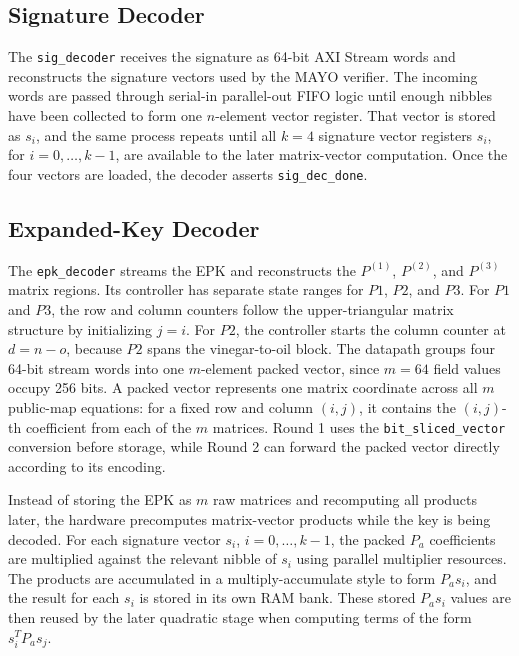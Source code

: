 \documentclass[conference]{IEEEtran}
\begin{document}
\subsection{Signature Decoder}
The \texttt{sig\_decoder} receives the signature as 64-bit AXI Stream words and reconstructs the signature vectors used by the MAYO verifier. The incoming words are passed through serial-in parallel-out FIFO logic until enough nibbles have been collected to form one \(n\)-element vector register. That vector is stored as \(s_i\), and the same process repeats until all \(k=4\) signature vector registers \(s_i\), for \(i=0,\ldots,k-1\), are available to the later matrix-vector computation. Once the four vectors are loaded, the decoder asserts \texttt{sig\_dec\_done}.

\subsection{Expanded-Key Decoder}
The \texttt{epk\_decoder} streams the EPK and reconstructs the \(P^{(1)}\), \(P^{(2)}\), and \(P^{(3)}\) matrix regions. Its controller has separate state ranges for \(P1\), \(P2\), and \(P3\). For \(P1\) and \(P3\), the row and column counters follow the upper-triangular matrix structure by initializing \(j=i\). For \(P2\), the controller starts the column counter at \(d=n-o\), because \(P2\) spans the vinegar-to-oil block. The datapath groups four 64-bit stream words into one \(m\)-element packed vector, since \(m=64\) field values occupy 256 bits. A packed vector represents one matrix coordinate across all \(m\) public-map equations: for a fixed row and column \((i,j)\), it contains the \((i,j)\)-th coefficient from each of the \(m\) matrices. Round 1 uses the \texttt{bit\_sliced\_vector} conversion before storage, while Round 2 can forward the packed vector directly according to its encoding.

Instead of storing the EPK as \(m\) raw matrices and recomputing all products later, the hardware precomputes matrix-vector products while the key is being decoded. For each signature vector \(s_i\), \(i=0,\ldots,k-1\), the packed \(P_a\) coefficients are multiplied against the relevant nibble of \(s_i\) using parallel multiplier resources. The products are accumulated in a multiply-accumulate style to form \(P_a s_i\), and the result for each \(s_i\) is stored in its own RAM bank. These stored \(P_a s_i\) values are then reused by the later quadratic stage when computing terms of the form \(s_i^T P_a s_j\).
\end{document}
